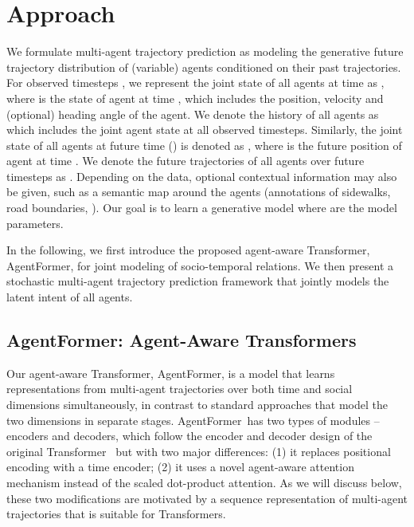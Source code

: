 \documentclass[10pt,twocolumn,letterpaper]{article}
\newcommand{\mname}{AgentFormer}
\begin{document}
\section{Approach}
\label{sec:approach}
We formulate multi-agent trajectory prediction as modeling the generative future trajectory distribution of  (variable) agents conditioned on their past trajectories. For observed timesteps , we represent the joint state of all  agents at time  as , where  is the state of agent  at time , which includes the position, velocity and (optional) heading angle of the agent. We denote the history of all agents as  which includes the joint agent state at all  observed timesteps. Similarly, the joint state of all  agents at future time  () is denoted as , where  is the future position of agent  at time . We denote the future trajectories of all  agents over  future timesteps as . Depending on the data, optional contextual information  may also be given, such as a semantic map around the agents (annotations of sidewalks, road boundaries, \etc). Our goal is to learn a generative model  where  are the model parameters.

In the following, we first introduce the proposed agent-aware Transformer, \mname, for joint modeling of socio-temporal relations. We then present a stochastic multi-agent trajectory prediction framework that jointly models the latent intent of all agents. 


\subsection{\mname: Agent-Aware Transformers}
\label{sec:agent_former}
Our agent-aware Transformer, \mname, is a model that learns representations from multi-agent trajectories over both time and social dimensions simultaneously, in contrast to standard approaches that model the two dimensions in separate stages. \mname\ has two types of modules -- encoders and decoders, which follow the encoder and decoder design of the original Transformer~\cite{vaswani2017attention} but with two major differences: (1) it replaces positional encoding with a time encoder; (2) it uses a novel agent-aware attention mechanism instead of the scaled dot-product attention. As we will discuss below, these two modifications are motivated by a sequence representation of multi-agent trajectories that is suitable for Transformers.
\end{document}
